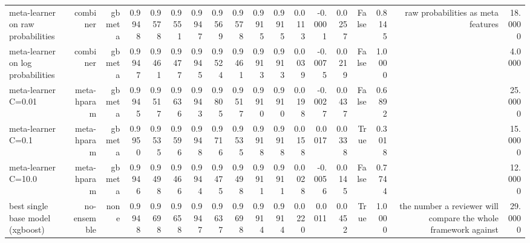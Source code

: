 \begin{table}[t]
{\begin{tabular}{lrrrrrrrrrrrrrrrrr}
meta-learner on raw probabilities & combiner & gbmeta & 0.9948 & 0.9578 & 0.9551 & 0.9947 & 0.9569 & 0.9578 & 0.9915 & 0.9915 & 0.0113 & -0.0001 & 0.0257 & False & 0.8145 & raw probabilities as meta features & 18.0000 \\
meta-learner on log probabilities & combiner & gbmeta & 0.9947 & 0.9461 & 0.9477 & 0.9945 & 0.9524 & 0.9461 & 0.9913 & 0.9913 & 0.0039 & -0.0075 & 0.0219 & False & 1.0000 &  & 4.0000 \\
meta-learner C=0.01 & meta-hparam & gbmeta & 0.9945 & 0.9517 & 0.9636 & 0.9943 & 0.9805 & 0.9517 & 0.9910 & 0.9910 & 0.0198 & -0.0027 & 0.0437 & False & 0.6892 &  & 25.0000 \\
meta-learner C=0.1 & meta-hparam & gbmeta & 0.9950 & 0.9535 & 0.9596 & 0.9948 & 0.9716 & 0.9535 & 0.9918 & 0.9918 & 0.0158 & 0.0017 & 0.0338 & True & 0.3018 &  & 15.0000 \\
meta-learner C=10.0 & meta-hparam & gbmeta & 0.9946 & 0.9498 & 0.9466 & 0.9944 & 0.9475 & 0.9498 & 0.9911 & 0.9911 & 0.0028 & -0.0056 & 0.0145 & False & 0.7744 &  & 12.0000 \\
best single base model (xgboost) & no-ensemble & none & 0.9948 & 0.9698 & 0.9658 & 0.9947 & 0.9637 & 0.9698 & 0.9914 & 0.9914 & 0.0220 & 0.0011 & 0.0452 & True & 1.0000 & the number a reviewer will compare the whole framework against & 29.0000 \\
\bottomrule
\end{tabular}
}
\end{table}
